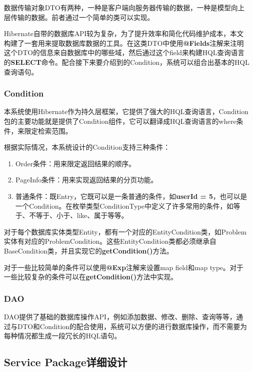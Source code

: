 数据传输对象DTO有两种，一种是客户端向服务器传输的数据，一种是模型向上层传输的数据。前者通过一个简单的类可以实现。

Hibernate自带的数据库API较为复杂，为了提升效率和简化代码维护成本，本文构建了一套用来提取数据库数据的工具。在这类DTO中使用\textbf{@Fields}注解来注明这个DTO的信息来自数据库中的哪些域，然后通过这个field来构建HQL查询语言的\textbf{SELECT}命令。配合接下来要介绍到的Condition，系统可以组合出基本的HQL查询语句。

\subsubsection{Condition}

本系统使用Hibernate作为持久层框架，它提供了强大的HQL查询语言，Condition包的主要功能就是提供了Condition组件，它可以翻译成HQL查询语言的where条件，来限定检索范围。

根据实际情况，本系统设计的Condition支持三种条件：
\begin{enumerate}
	\item Order条件：用来限定返回结果的顺序。
	\item PageInfo条件：用来实现返回结果的分页功能。
	\item 普通条件：既Entry，它既可以是一条普通的条件，如\textbf{userId = 5}，也可以是一个Condition。在枚举类型ConditionType中定义了许多常用的条件，如等于、不等于、小于、like、属于等等。
\end{enumerate}


对于每个数据库实体类型Entity，都有一个对应的EntityCondition类，如Problem实体有对应的ProblemCondition。这些EntityCondition类都必须继承自BaseCondition类，并且实现它的\textbf{getCondition()}方法。

对于一些比较简单的条件可以使用\textbf{@Exp}注解来设置map field和map type。对于一些比较复杂的条件可以在\textbf{getCondition()}方法中实现。

\subsubsection{DAO}

DAO提供了基础的数据库操作API，例如添加数据、修改、删除、查询等等，通过与DTO和Condition的配合使用，系统可以方便的进行数据库操作，而不需要为每种情况都生成一段冗长的HQL语句。

\subsection{Service Package详细设计}

